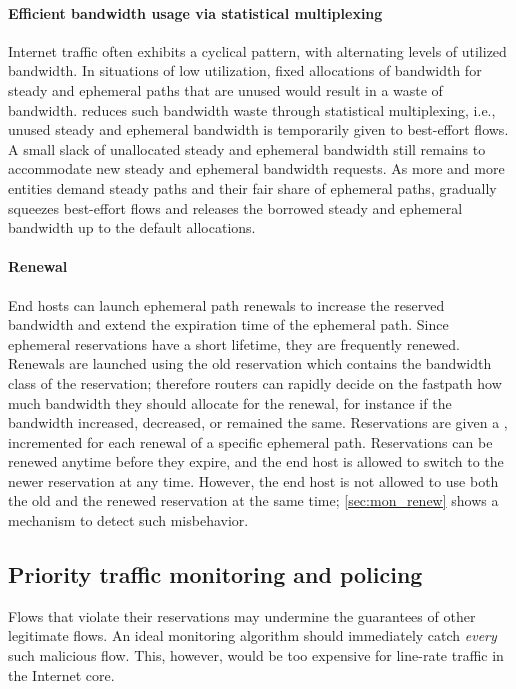\paragraph{Efficient bandwidth usage via statistical multiplexing}
Internet traffic often exhibits a cyclical pattern, with alternating levels of
utilized bandwidth.
In situations of low utilization, fixed
allocations of bandwidth for steady and ephemeral paths that are
unused would result in a waste of bandwidth. \name reduces such
bandwidth waste through statistical multiplexing,
i.e., unused steady and ephemeral bandwidth is temporarily given to
best-effort flows. A small slack of unallocated steady and ephemeral
bandwidth still remains to accommodate new steady and ephemeral
bandwidth requests. As more and more entities demand steady paths and
their fair share of ephemeral paths, \name gradually squeezes
best-effort flows and releases the borrowed steady and ephemeral
bandwidth up to the default allocations.

\paragraph{Renewal} End hosts can launch ephemeral path renewals to increase
the reserved bandwidth and extend the expiration time of the ephemeral path.
Since ephemeral reservations have a short lifetime, they are frequently
renewed. Renewals are launched using the old reservation which contains the
bandwidth class of the reservation; therefore routers can rapidly decide on the
fastpath how much bandwidth they should allocate for the renewal, for instance
if the bandwidth increased, decreased, or remained the same. Reservations are
given a , incremented for each renewal of a specific
ephemeral path. Reservations can be renewed anytime before they expire, and the
end host is allowed to switch to the newer reservation at any time. However,
the end host is not allowed to use both the old and the renewed reservation at
the same time; \autoref{sec:mon_renew} shows a mechanism to detect such
misbehavior.


\subsection{Priority traffic monitoring and policing}
\label{sec:mon}

\noindent Flows that violate their reservations may undermine the
guarantees of other legitimate flows. An ideal monitoring algorithm
should immediately catch \emph{every} such malicious flow. This,
however, would be too expensive for line-rate traffic in the Internet
core.

